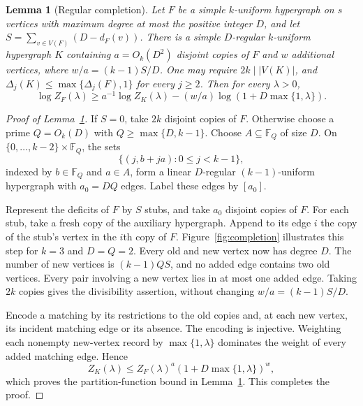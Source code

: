 \documentclass[11pt,reqno]{amsart}
\numberwithin{equation}{section}
\theoremstyle{plain}
\newtheorem{lemma}[theorem]{Lemma}
\theoremstyle{definition}
\begin{document}
\begin{lemma}[Regular completion]\label{lem:completion}
    Let $F$ be a simple $k$-uniform hypergraph on $s$ vertices with maximum degree at most the positive integer $D$, and let $S=\sum_{v\in V(F)}(D-d_F(v))$.
    There is a simple $D$-regular $k$-uniform hypergraph $K$ containing $a=O_k(D^2)$ disjoint copies of $F$ and $w$ additional vertices, where $w / a = (k-1)S/D$.
    One may require $2k\mid |V(K)|$, and $\Delta_j(K)\le\max\{\Delta_j(F),1\}$ for every $j\ge2$.
    Then for every $\lambda>0$,
    \begin{equation*}
        \log Z_F(\lambda)\ge a^{-1}\log Z_K(\lambda) -(w/a)\log(1+D\max\{1,\lambda\}).
    \end{equation*}
\end{lemma}
\begin{proof}[Proof of Lemma~\ref{lem:completion}]
    If $S=0$, take $2k$ disjoint copies of $F$.
    Otherwise choose a prime $Q=O_k(D)$ with $Q\ge\max\{D,k-1\}$.
    Choose $A\subseteq\mathbb F_Q$ of size $D$.
    On $\{0,\ldots,k-2\}\times\mathbb F_Q$, the sets
    \[
        \{(j,b+ja):0\le j<k-1\},
    \]
    indexed by $b\in\mathbb F_Q$ and $a\in A$, form a linear $D$-regular $(k-1)$-uniform hypergraph with $a_0=DQ$ edges.
    Label these edges by $[a_0]$.
    
    Represent the deficits of $F$ by $S$ stubs, and take $a_0$ disjoint copies of $F$.
    For each stub, take a fresh copy of the auxiliary hypergraph.
    Append to its edge $i$ the copy of the stub's vertex in the $i$th copy of $F$.
    Figure~\ref{fig:completion} illustrates this step for $k=3$ and $D=Q=2$.
    Every old and new vertex now has degree $D$.
    The number of new vertices is $(k-1)QS$, and no added edge contains two old vertices.
    Every pair involving a new vertex lies in at most one added edge.
    Taking $2k$ copies gives the divisibility assertion, without changing $w/a=(k-1)S/D$.

    Encode a matching by its restrictions to the old copies and, at each new vertex, its incident matching edge or its absence.
    The encoding is injective.
    Weighting each nonempty new-vertex record by $\max\{1,\lambda\}$ dominates the weight of every added matching edge.
    Hence
    \[
        Z_K(\lambda)\le Z_F(\lambda)^a(1+D\max\{1,\lambda\})^w,
    \]
    which proves the partition-function bound in Lemma~\ref{lem:completion}.
    This completes the proof.
\end{proof}
\end{document}
